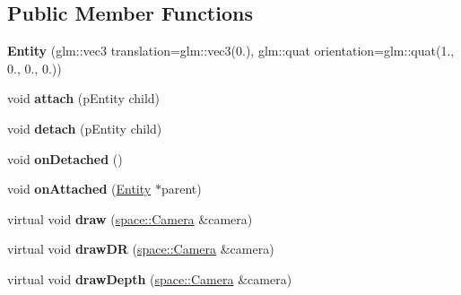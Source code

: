 \subsection*{Public Member Functions}
\begin{DoxyCompactItemize}
\item 
\hypertarget{classfillwave_1_1models_1_1Entity_aeb0600d09ee5d57db3f4c76984ebea2c}{}{\bfseries Entity} (glm\+::vec3 translation=glm\+::vec3(0.), glm\+::quat orientation=glm\+::quat(1., 0., 0., 0.))\label{classfillwave_1_1models_1_1Entity_aeb0600d09ee5d57db3f4c76984ebea2c}

\item 
\hypertarget{classfillwave_1_1models_1_1Entity_a377e85bb6666e808004471721232b7e4}{}void {\bfseries attach} (p\+Entity child)\label{classfillwave_1_1models_1_1Entity_a377e85bb6666e808004471721232b7e4}

\item 
\hypertarget{classfillwave_1_1models_1_1Entity_a8f3d3d1291491ae61930e7159634ccb0}{}void {\bfseries detach} (p\+Entity child)\label{classfillwave_1_1models_1_1Entity_a8f3d3d1291491ae61930e7159634ccb0}

\item 
\hypertarget{classfillwave_1_1models_1_1Entity_ad63db6ab433c1bfba2ec8222a15dd956}{}void {\bfseries on\+Detached} ()\label{classfillwave_1_1models_1_1Entity_ad63db6ab433c1bfba2ec8222a15dd956}

\item 
\hypertarget{classfillwave_1_1models_1_1Entity_af4a59792cf177d095aef718881ede8aa}{}void {\bfseries on\+Attached} (\hyperlink{classfillwave_1_1models_1_1Entity}{Entity} $\ast$parent)\label{classfillwave_1_1models_1_1Entity_af4a59792cf177d095aef718881ede8aa}

\item 
\hypertarget{classfillwave_1_1models_1_1Entity_ab9892968cd70d1abfb8d36660a71865a}{}virtual void {\bfseries draw} (\hyperlink{classfillwave_1_1space_1_1Camera}{space\+::\+Camera} \&camera)\label{classfillwave_1_1models_1_1Entity_ab9892968cd70d1abfb8d36660a71865a}

\item 
\hypertarget{classfillwave_1_1models_1_1Entity_a37b5d9b3aaa361aaf99c4649023314f7}{}virtual void {\bfseries draw\+D\+R} (\hyperlink{classfillwave_1_1space_1_1Camera}{space\+::\+Camera} \&camera)\label{classfillwave_1_1models_1_1Entity_a37b5d9b3aaa361aaf99c4649023314f7}

\item 
\hypertarget{classfillwave_1_1models_1_1Entity_ad49b41494b75d856d60dafcce88737ec}{}virtual void {\bfseries draw\+Depth} (\hyperlink{classfillwave_1_1space_1_1Camera}{space\+::\+Camera} \&camera)\label{classfillwave_1_1models_1_1Entity_ad49b41494b75d856d60dafcce88737ec}


\end{DoxyCompactItemize}
